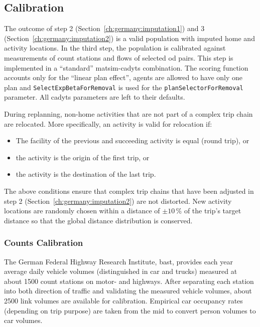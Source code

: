 \subsection{Calibration}

The outcome of step 2 (Section~\ref{ch:germany:imputation1}) and 3 (Section~\ref{ch:germany:imputation2}) is a valid population with imputed home and activity locations. In the third step, the population is calibrated against measurements of count stations and flows of selected \gls{od} pairs. This step is implemented in a ``standard'' \gls{matsim}-\gls{cadyts} combination. The scoring function accounts only for the ``linear plan effect'', agents are allowed to have only one plan and \lstinline|SelectExpBetaForRemoval| is used for the \lstinline|planSelectorForRemoval| parameter. All \gls{cadyts} parameters are left to their defaults.

During replanning, non-home activities that are not part of a complex trip chain are relocated. More specifically, an activity is valid for relocation if:
\begin{itemize}
\item The facility of the previous and succeeding activity is equal (round trip), or
\item the activity is the origin of the first trip, or
\item the activity is the destination of the last trip.
\end{itemize}
The above conditions ensure that complex trip chains that have been adjusted in step 2 (Section~\ref{ch:germany:imputation2}) are not distorted. New activity locations are randomly chosen within a distance of $\pm10$\,\% of the trip's target distance so that the global distance distribution is conserved.

\subsubsection{Counts Calibration}

The German Federal Highway Research Institute, \gls{bast}, provides each year average daily vehicle volumes (distinguished in car and trucks) measured at about 1500 count stations on motor- and highways. After separating each station into both direction of traffic and validating the measured vehicle volumes, about 2500 link volumes are available for calibration. Empirical car occupancy rates (depending on trip purpose) are taken from the \gls{mid} to convert person volumes to car volumes.

